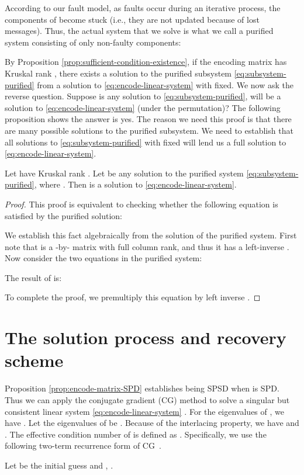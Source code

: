\documentclass[11pt]{article}
\begin{document}
According to our fault model, as faults occur during an iterative process,
the components of  become stuck (i.e., they are not updated because of lost messages).
Thus, the actual system that we solve is what we call a purified system consisting
of only non-faulty components:
			

By Proposition \ref{prop:sufficient-condition-existence}, if the encoding
matrix  has Kruskal rank , there exists a solution to the purified
subsystem \eqref{eq:subsystem-purified} from a solution to \eqref{eq:encode-linear-system}
with  fixed. We now ask the reverse question.
Suppose  is any solution to \eqref{eq:subsystem-purified},
will  be a solution to \eqref{eq:encode-linear-system}
(under the permutation)?  The following proposition shows the answer is yes.
The reason we need this proof is that there are many possible solutions to
the purified subsystem. We need to establish that all solutions to
\eqref{eq:subsystem-purified} with  fixed will lend us a full solution
to \eqref{eq:encode-linear-system}. 

\begin{proposition} \label{prop:equivalence-encode-system-subsystem}
Let  have Kruskal rank . Let 
be any solution to the purified system \eqref{eq:subsystem-purified},
where . Then  is a solution to
\eqref{eq:encode-linear-system}.
\end{proposition}
\begin{proof}
This proof is equivalent to checking whether the following equation is satisfied by
the purified solution:

We establish this fact algebraically from the solution of the purified system.
First note that  is a -by- matrix with full column rank,
and thus it has a left-inverse .
Now consider the two equations in the purified system: 

The result of  is: 

To complete the proof, we premultiply this equation by left inverse .
\end{proof}

\section{The solution process and recovery scheme}
\label{section:solution-process-and-recovery-scheme}

Proposition \ref{prop:encode-matrix-SPD} establishes  being SPSD when  is SPD.
Thus we can apply the conjugate gradient (CG) method to solve a singular but consistent
linear system \eqref{eq:encode-linear-system} \cite{AshbyMS:1990}. For the 
eigenvalues of , we have .
Let the eigenvalues of  be . Because of the
interlacing property, we have  and .
The effective condition number of  is defined as .
Specifically, we use the following two-term recurrence form of CG~\cite{Meurant:2006}.
\begin{algorithm}
\caption{}
\begin{algorithmic}[1]
\label{alg:two-term-recurrence-cg}
\STATE Let  be the initial guess and , .
\STATE 
\STATE 
\STATE 
\STATE 
\STATE 
\STATE 
\ENDFOR
\end{algorithmic}
\end{algorithm}
\end{document}
